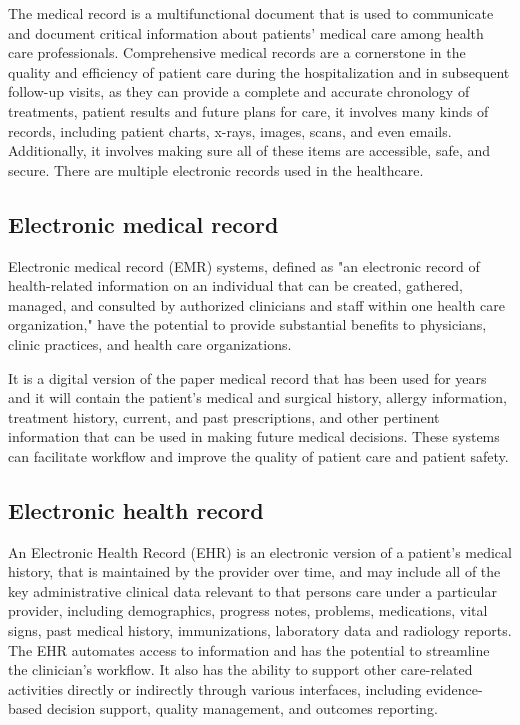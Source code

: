 The medical record is a multifunctional document that is used to communicate and document critical information about patients’ medical care among health care professionals. Comprehensive medical records are a cornerstone in the quality and efficiency of patient care during the hospitalization and in subsequent follow-up visits, as they can provide a complete and accurate chronology of treatments, patient results and future plans for care\cite{wong2009developing}, it involves many kinds of records, including patient charts, x-rays, images, scans, and even emails. Additionally, it involves making sure all of these items are accessible, safe, and secure.
There are multiple electronic records used in the healthcare.
\subsection{Electronic medical record}
Electronic medical record (EMR) systems, defined as "an electronic record of health-related information on an individual that can be created, gathered, managed, and consulted by authorized clinicians and staff within one health care organization,"  have the potential to provide substantial benefits to physicians, clinic practices, and health care organizations. 

It  is a digital version of the paper medical record that has been used for years and it will contain the patient’s medical and surgical history, allergy information, treatment history, current, and past prescriptions, and other pertinent information that can be used in making future medical decisions\cite{WheelWhatAre}. These systems can facilitate workflow and improve the quality of patient care and patient safety\cite{ElectronicMedicalRecord}.

\subsection{Electronic health record}
An Electronic Health Record (EHR) is an electronic version of a patient's medical history, that is maintained by the provider over time, and may include all of the key administrative clinical data relevant to that persons care under a particular provider, including demographics, progress notes, problems, medications, vital signs, past medical history, immunizations, laboratory data and radiology reports. The EHR automates access to information and has the potential to streamline the clinician's workflow.  It also has the ability to support other care-related activities directly or indirectly through various interfaces, including evidence-based decision support, quality management, and outcomes reporting. 
 
